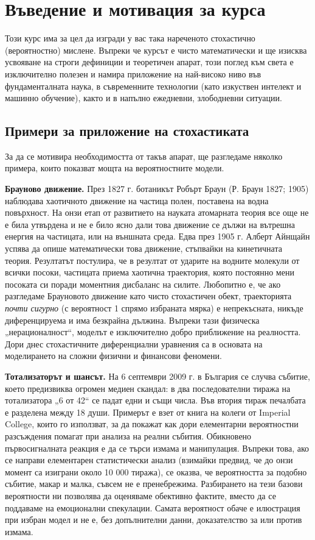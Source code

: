 \section{Въведение и мотивация за курса}

Този курс има за цел да изгради у вас така нареченото стохастично (вероятностно) мислене. Въпреки че курсът е чисто математически и ще изисква усвояване на строги дефиниции и теоретичен апарат, този поглед към света е изключително полезен и намира приложение на най-високо ниво във фундаменталната наука, в съвременните технологии (като изкуствен интелект и машинно обучение), както и в напълно ежедневни, злободневни ситуации.

\subsection{Примери за приложение на стохастиката}

За да се мотивира необходимостта от такъв апарат, ще разгледаме няколко примера, които показват мощта на вероятностните модели.

\textbf{Брауново движение.} През 1827 г. ботаникът Робърт Браун (Р. Браун 1827; 1905) наблюдава хаотичното движение на частица полен, поставена на водна повърхност. На онзи етап от развитието на науката атомарната теория все още не е била утвърдена и не е било ясно дали това движение се дължи на вътрешна енергия на частицата, или на външната среда. Едва през 1905 г. Алберт Айнщайн успява да опише математически това движение, стъпвайки на кинетичната теория. Резултатът постулира, че в резултат от ударите на водните молекули от всички посоки, частицата приема хаотична траектория, която постоянно мени посоката си поради моментния дисбаланс на силите.
Любопитно е, че ако разгледаме Брауновото движение като чисто стохастичен обект, траекторията \emph{почти сигурно} (с вероятност 1 спрямо избраната мярка) е непрекъсната, никъде диференцируема и има безкрайна дължина. Въпреки тази физическа „нерационалност“, моделът е изключително добро приближение на реалността. Дори днес стохастичните диференциални уравнения са в основата на моделирането на сложни физични и финансови феномени.


\label{ex:01-7}\textbf{Тотализаторът и шансът.} На 6 септември 2009 г. в България се случва събитие, което предизвиква огромен медиен скандал: в два последователни тиража на тотализатора „6 от 42“ се падат едни и същи числа. Във втория тираж печалбата е разделена между 18 души. Примерът е взет от книга на колеги от Imperial College, които го използват, за да покажат как дори елементарни вероятностни разсъждения помагат при анализа на реални събития. Обикновено първосигналната реакция е да се търси измама и манипулация. Въпреки това, ако се направи елементарен статистически анализ (взимайки предвид, че до онзи момент са изиграни около 10 000 тиража), се оказва, че вероятността за подобно събитие, макар и малка, съвсем не е пренебрежима. Разбирането на тези базови вероятности ни позволява да оценяваме обективно фактите, вместо да се поддаваме на емоционални спекулации. Самата вероятност обаче е илюстрация при избран модел и не е, без допълнителни данни, доказателство за или против измама.


